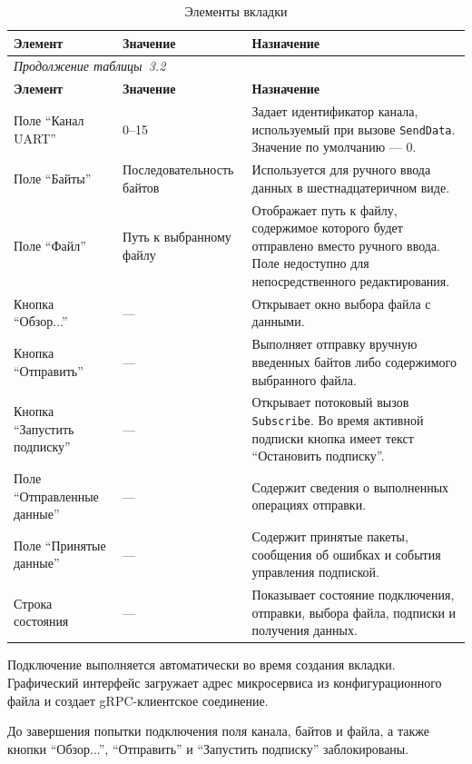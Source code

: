 \begin{longtable}{
		|p{}
		|p{}
		|p{}|
	}
	\caption{Элементы вкладки} \\
	\hline
	\textbf{Элемент} & \textbf{Значение} & \textbf{Назначение} \\
	\hline
	\endfirsthead
	\multicolumn{3}{l}{\textit{Продолжение таблицы~3.2}} \\
	\hline
	\textbf{Элемент} & \textbf{Значение} & \textbf{Назначение} \\
	\hline
	\endhead
	Поле ``Канал UART'' & 0--15 & Задает идентификатор канала, используемый при вызове \texttt{SendData}. Значение по умолчанию --- 0. \\
	\hline
	Поле ``Байты'' & Последовательность байтов & Используется для ручного ввода данных в шестнадцатеричном виде. \\
	\hline
	Поле ``Файл'' & Путь к выбранному файлу & Отображает путь к файлу, содержимое которого будет отправлено вместо ручного ввода. Поле недоступно для непосредственного редактирования. \\
	\hline
	Кнопка ``Обзор...'' & --- & Открывает окно выбора файла с данными. \\
	\hline
	Кнопка ``Отправить'' & --- & Выполняет отправку вручную введенных байтов либо содержимого выбранного файла. \\
	\hline
	Кнопка ``Запустить подписку'' & --- & Открывает потоковый вызов \texttt{Subscribe}. Во время активной подписки кнопка имеет текст ``Остановить подписку''. \\
	\hline
	Поле ``Отправленные данные'' & --- & Содержит сведения о выполненных операциях отправки. \\
	\hline
	Поле ``Принятые данные'' & --- & Содержит принятые пакеты, сообщения об ошибках и события управления подпиской. \\
	\hline
	Строка состояния & --- & Показывает состояние подключения, отправки, выбора файла, подписки и получения данных. \\
	\hline
\end{longtable}

Подключение выполняется автоматически во время создания вкладки. Графический
интерфейс загружает адрес микросервиса из конфигурационного файла и создает
gRPC-клиентское соединение.

До завершения попытки подключения поля канала, байтов и файла, а также кнопки
``Обзор...'', ``Отправить'' и ``Запустить подписку'' заблокированы.

